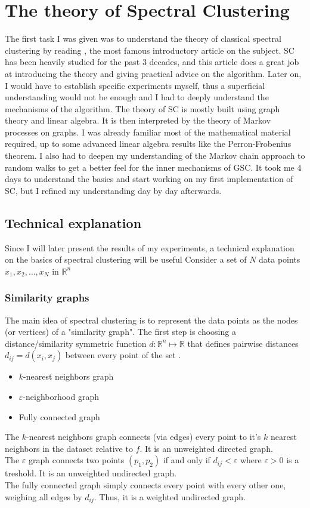 \documentclass[a4paper,12pt]{article}
\theoremstyle{definition}
\theoremstyle{plain}
\def\R{\mathbb{R}}%
\begin{document}
\section{The theory of Spectral Clustering}
The first task I was given was to understand the theory of classical spectral clustering by reading \cite[A tutorial on Spectral Clustering]{tutorial}, the most famous introductory article on the subject. SC has been heavily studied for the past $3$ decades, and this article does a great job at introducing the theory and giving practical advice on the algorithm. Later on, I would have to establish specific experiments myself, thus a superficial understanding would not be enough and I had to deeply understand the mechanisms of the algorithm. The theory of SC is mostly built using graph theory and linear algebra. It is then interpreted by the theory of Markov processes on graphs. I was already familiar most of the mathematical material required, up to some advanced linear algebra results like the Perron-Frobenius theorem. I also had to deepen my understanding of the Markov chain approach to random walks to get a better feel for the inner mechanisms of GSC.
It took me $4$ days to understand the basics and start working on my first implementation of SC, but I refined my understanding day by day afterwards.
\subsection{Technical explanation}
Since I will later present the results of my experiments, a technical explanation on the basics of spectral clustering will be useful
Consider a set of $N$ data points $x_1,x_2, \ldots ,x_N$ in $\R^n$
\subsubsection{Similarity graphs}
The main idea of spectral clustering is to represent the data points as the nodes (or vertices) of a "similarity graph". The first step is choosing a distance/similarity symmetric function $d: \R^n \mapsto \R$ that defines pairwise distances $d_{ij} = d(x_i,x_j)$ between every point of the set .

\begin{itemize}
	\item $k$-nearest neighbors graph
	\item $\varepsilon$-neighborhood graph
	\item Fully connected graph
\end{itemize}
The $k$-nearest neighbors graph connects (via edges) every point to it's $k$ nearest neighbors in the dataset relative to $f$. It is an unweighted directed graph. \\
The $\varepsilon$ graph connects two points $(p_1,p_2)$ if and only if $d_{ij} < \varepsilon$ where $\varepsilon > 0$  is a treshold. It is an unweighted undirected graph. \\
The fully connected graph simply connects every point with every other one, weighing all edges by $d_{ij}$. Thus, it is a weighted undirected graph. \\
\end{document}
